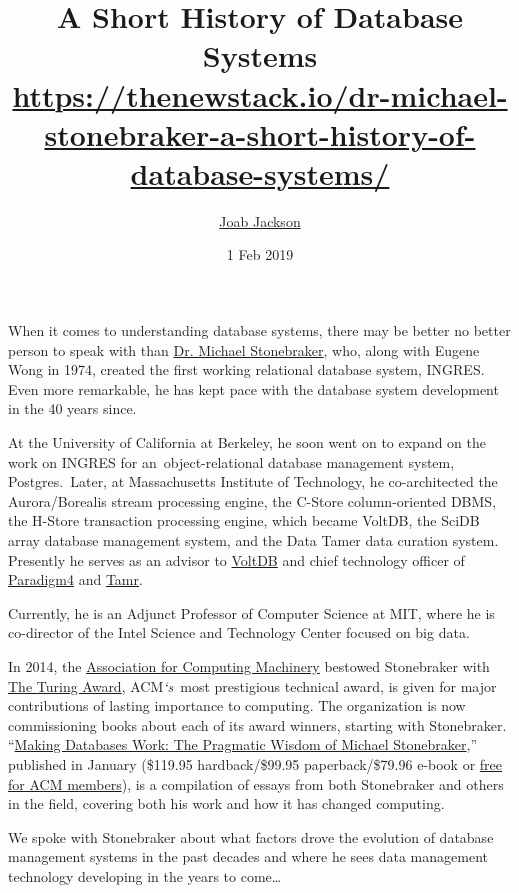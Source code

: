 \documentclass[a4paper,12pt,notitlepage,twoside,openright]{article}
\title{A Short History of Database Systems\\\scriptsize \url{https://thenewstack.io/dr-michael-stonebraker-a-short-history-of-database-systems/}}
\author{\href{https://thenewstack.io/author/joab/}{{Joab
Jackson}}}
\date{1 Feb 2019}
\begin{document}
\maketitle

When it comes to understanding database systems, there may be better no
better person to speak with than
\href{https://amturing.acm.org/award_winners/stonebraker_1172121.cfm}{{Dr.
Michael Stonebraker}}, who, along with Eugene Wong in 1974, created the
first working relational database system, INGRES. Even more remarkable,
he has kept pace with the database system development in the 40 years
since.

At the University of California at Berkeley, he soon went on to expand
on the work on INGRES for an~object-relational database management
system, Postgres.~Later, at Massachusetts Institute of Technology, he
co-architected the Aurora/Borealis stream processing engine, the C-Store
column-oriented DBMS, the H-Store transaction processing engine, which
became VoltDB, the SciDB array database management system, and the Data
Tamer data curation system. Presently he serves as an advisor to
\href{https://www.voltdb.com/}{{VoltDB}} and chief technology officer of
\href{https://www.paradigm4.com/}{{Paradigm4}} and
\href{https://www.paradigm4.com/}{{Tamr}}.

Currently, he is an Adjunct Professor of Computer Science at MIT, where
he is co-director of the Intel Science and Technology Center focused on
big data.

In 2014, the \href{https://www.acm.org/}{{Association for Computing
Machinery}} bestowed Stonebraker with
\href{https://amturing.acm.org/}{{The Turing Award}}, ACM\emph{`s}~most
prestigious technical award, is given for major contributions of lasting
importance to computing. The organization is now commissioning books
about each of its award winners, starting with Stonebraker.
``\href{https://www.amazon.com/Making-Databases-Work-Pragmatic-Stonebraker/dp/1947487167/ref=sr_1_1?ie=UTF8\&qid=1549040750\&sr=8-1\&keywords=\%22Making+Databases+Work\%22}{{Making
Databases Work: The Pragmatic Wisdom of Michael Stonebraker}},''
published in January (\$119.95 hardback/\$99.95 paperback/\$79.96 e-book
or \href{https://dl.acm.org/citation.cfm?id=3226595}{{free for ACM
members}}), is a compilation of essays from both Stonebraker and others
in the field, covering both his work and how it has changed computing.

We spoke with Stonebraker about what factors drove the evolution of
database management systems in the past decades and where he sees data
management technology developing in the years to come\ldots{}
\end{document}
